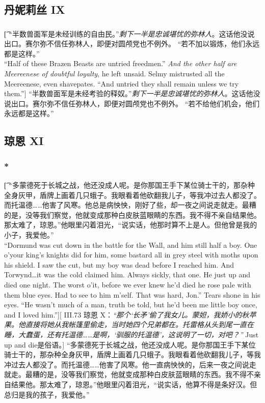 \documentclass[12pt,a4paper]{article}
\begin{document}
	
\subsection{丹妮莉丝 IX}
\subsubsection{}\t[
	“半数兽面军是未经训练的自由民。”\emph{剩下一半是忠诚堪忧的弥林人}。这话他没说出口。赛尔弥不信任弥林人，即便对圆颅党也不例外。
	“若不加以锻炼，他们永远都是这样。”\\
	“Half of these Brazen Beasts are untried freedmen.” \emph{And the other half are Meereenese of doubtful loyalty}, he left unsaid. Selmy mistrusted all the Meereenese, even shavepates.
	“And untried they shall remain unless we try them.”]
	“半数兽面军是未经考验的释奴。”\emph{剩下一半是忠诚堪忧的弥林人}。这话他没说出口。赛尔弥不信任弥林人，即便对圆颅党也不例外。
	“若不给他们机会，他们永远都是这样。”
	
\subsection{琼恩 XI}
\subsubsection{\color{red}*}\t[
	“多蒙德死于长城之战，他还没成人呢。是你那国王手下某位骑士干的，那杂种全身灰甲，盾牌上画着几只蛾子。我眼看着他砍翻我儿子，等我冲过去人都没了。而托温德……他害了风寒。他总是病怏怏，刚好了些，却一夜之间说走就走。最糟的是，没等我们察觉，他就变成那种白皮肤蓝眼睛的东西。我不得不亲自结果他。那太难了，琼恩。”他眼里闪着泪光，“说实话，他那时算不上是人。但他曾是我的小子，我爱他。”\\
	“Dormund was cut down in the battle for the Wall, and him still half a boy. One o'your king's knights did for him, some bastard all in grey steel with moths upon his shield. I saw the cut, but my boy was dead before I reached him. And Torwynd\ldots it was the cold claimed him. Always sickly, that one. He just up and died one night. The worst o'it, before we ever knew he'd died he rose pale with them blue eyes. Had to see to him m'self. That was hard, Jon.” Tears shone in his eyes. “He wasn't much of a man, truth be told, but he'd been me little boy once, and I loved him.”][
	III.73 琼恩 X：\emph{“那个‘长矛’偷了我女儿。蒙妲，我娇小的秋苹果。他直接将她从我帐篷里偷走，当时她四个兄弟都在。托雷格从头到尾一直在睡，大蠢蛋，还有托温德……是啊，‘驯服的托温德’，这说明了一切，对吧？”} Just up and die是俗语。]
	“多蒙德死于长城之战，他还没成人呢。是你那国王手下某位骑士干的，那杂种全身灰甲，盾牌上画着几只蛾子。我眼看着他砍翻我儿子，等我冲过去人都没了。而托温德……他害了风寒。他一直病怏怏的，后来一夜之间说走就走。最糟的是，没等我们察觉，他就变成那种白皮肤蓝眼睛的东西。我不得不亲自结果他。那太难了，琼恩。”他眼里闪着泪光，“说实话，他算不得是条好汉。但总归是我的孩子，我爱他。”
\end{document}

